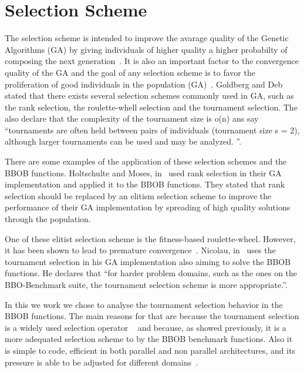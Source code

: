 \section{Selection Scheme}\label{sec:background:Selection Scheme} 

The selection scheme is intended to improve the avarage quality of the Genetic Algorithms (GA) by giving individuals of higher quality a higher probabilty of composing the next generation~\cite{blickle1995mathematical}. It is also an important factor to the convergence quality of the GA and the goal of any selection scheme is to favor the proliferation of good individuals in the population (GA)~\cite{harik1999gambler}. Goldberg and Deb~\cite{goldberg1991comparative} stated that there exists several selection schemes commonly used in GA, such as the rank selection, the roulette-whell selection and the tournament selection. The also declare that the complexity of the tournament size is o(n) ans say ``tournaments are often held
between pairs of individuals (tournament size s = 2), although larger tournaments can be used and may be analyzed. ''. 

There are some examples of the application of these selection schemes and the BBOB functions. Holtschulte and Moses, in~\cite{holtschulte2013benchmarking} used rank selection in their GA implementation and applied it to the BBOB functions. They stated that rank selection should be replaced by an elitism selection scheme to improve the performance of their GA implementation by spreading of high quality solutions through the population. 

One of these elitist selection scheme is the fitness-based roulette-wheel. However, it has been shown to lead to premature convergence~\cite{baker1987reducing}. Nicolau, in~\cite{nicolau2009application} uses the tournament selection in his GA implementation also aiming to solve the BBOB functions. He declares that ``for harder problem domains, such as the ones on the BBO-Benchmark suite, the tournament selection scheme is more appropriate.''.

In this we work we chose to analyse the tournament selection behavior in the BBOB functions. The main reasons for that are because the tournament selection is a widely used selection operator ~\cite{harik1999gambler, sawyerr2011comparative, kaelo2007integrated} and because, as showed previously, it is a more adequated selection scheme to by the BBOB benchmark functions. Also it is simple to code, efficient in both parallel and non parallel architectures, and its pressure is able to be adjusted for different domains~\cite{miller1995genetic}.



